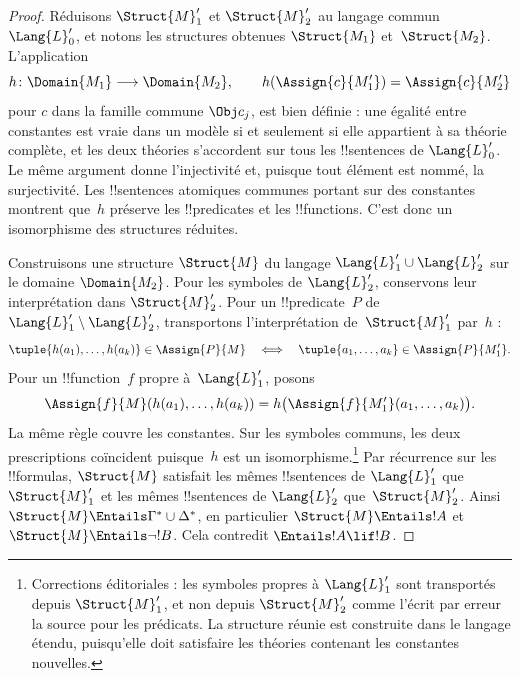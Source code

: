 \documentclass[../../../include/open-logic-section]{subfiles}
\begin{document}
\begin{proof}
Réduisons $\Struct{M}'_1$ et
$\Struct{M}'_2$ au langage commun
$\Lang{L}'_0$, et notons les
structures obtenues $\Struct{M_1}$
et~$\Struct{M_2}$. L'application
\[
  h\colon\Domain{M_1}\longrightarrow
  \Domain{M_2},\qquad
  h(\Assign{c}{M'_1})=\Assign{c}{M'_2}
\]
pour $c$ dans la famille commune $\Obj c_j$, est bien définie : une égalité
entre constantes est vraie dans
un modèle si et seulement si elle
appartient à sa théorie complète,
et les deux théories s'accordent
sur tous les !!{sentence}s de
$\Lang{L}'_0$. Le même argument
donne l'injectivité et, puisque
tout élément est nommé, la
surjectivité. Les !!{sentence}s
atomiques communes portant sur
des constantes montrent que~$h$
préserve les !!{predicate}s et
les !!{function}s. C'est donc
un isomorphisme des structures
réduites.

Construisons une structure
$\Struct{M}$ du langage
$\Lang{L}'_1\cup\Lang{L}'_2$
sur le domaine $\Domain{M_2}$.
Pour les symboles de
$\Lang{L}'_2$, conservons leur
interprétation dans
$\Struct{M}'_2$. Pour un
!!{predicate}~$P$ de
$\Lang{L}'_1\setminus\Lang{L}'_2$,
transportons l'interprétation
de~$\Struct{M}'_1$ par~$h$ :
\[
  \tuple{h(a_1),\dots,h(a_k)}
  \in\Assign{P}{M}
  \quad\Longleftrightarrow\quad
  \tuple{a_1,\dots,a_k}
  \in\Assign{P}{M'_1}.
\]
Pour un !!{function}~$f$
propre à~$\Lang{L}'_1$, posons
\[
\Assign{f}{M}(h(a_1),\dots,h(a_k))
=h\bigl(\Assign{f}{M'_1}(a_1,\dots,a_k)\bigr).
\]
La même règle couvre les
constantes. Sur les symboles
communs, les deux prescriptions
coïncident puisque~$h$ est un
isomorphisme.\footnote{Corrections éditoriales : les symboles propres à $\Lang{L}'_1$ sont transportés depuis $\Struct{M}'_1$, et non depuis $\Struct{M}'_2$ comme l'écrit par erreur la source pour les prédicats. La structure réunie est construite dans le langage étendu, puisqu'elle doit satisfaire les théories contenant les constantes nouvelles.} Par récurrence
sur les !!{formula}s,
$\Struct{M}$ satisfait les mêmes
!!{sentence}s de $\Lang{L}'_1$
que~$\Struct{M}'_1$ et les mêmes
!!{sentence}s de $\Lang{L}'_2$
que~$\Struct{M}'_2$. Ainsi
$\Struct{M}\Entails\Gamma^*\cup\Delta^*$,
en particulier
$\Struct{M}\Entails !A$ et
$\Struct{M}\Entails\lnot !B$.
Cela contredit $\Entails !A\lif !B$.
\end{proof}
\end{document}

